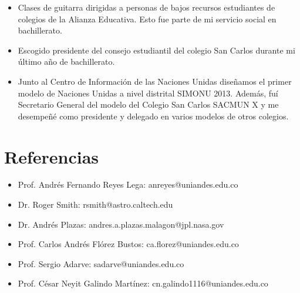 \documentclass[line,margin]{res}
\begin{document}
\begin{resume}
\begin{itemize}
\item Clases de guitarra dirigidas a personas de bajos recursos estudiantes de colegios de la Alianza Educativa. Esto fue parte de mi servicio social en bachillerato.

\item Escogido presidente del consejo estudiantil del colegio San Carlos durante mi último año de bachillerato.

\item Junto al Centro de Información de las Naciones Unidas diseñamos el primer modelo de Naciones Unidas a nivel distrital SIMONU 2013. Además, fuí Secretario General del modelo del Colegio San Carlos SACMUN X y me desempeñé como presidente y delegado en varios modelos de otros colegios.

\end{itemize}  
  
\section{Referencias}  

\begin{itemize}

\item Prof. Andrés Fernando Reyes Lega: anreyes@uniandes.edu.co

\item Dr. Roger Smith: rsmith@astro.caltech.edu 

\item Dr. Andrés Plazas: andres.a.plazas.malagon@jpl.nasa.gov

\item Prof. Carlos Andrés Flórez Bustos: ca.florez@uniandes.edu.co

\item Prof. Sergio Adarve: sadarve@uniandes.edu.co

\item Prof. César Neyit Galindo Martínez: cn.galindo1116@uniandes.edu.co

\end{itemize}
  
\end{resume}
\end{document}
